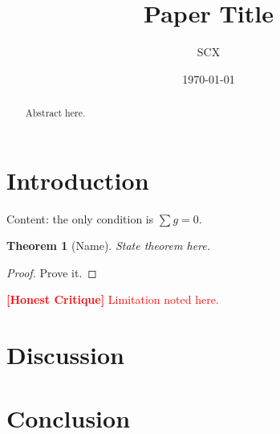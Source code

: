 \documentclass{article}
\title{Paper Title}
\author{SCX}
\date{\today}
\newtheorem{theorem}{Theorem}[section]
\theoremstyle{remark}
\newcommand{\honestcrit}[1]{\textcolor{red}{\textbf{[Honest Critique]} #1}}
\begin{document}
\maketitle

\begin{abstract}
Abstract here.
\end{abstract}

\section{Introduction}

Content: the only condition is $\sum g = 0$.

\begin{theorem}[Name]
State theorem here.
\end{theorem}

\begin{proof}
Prove it.
\end{proof}

\honestcrit{Limitation noted here.}

\section{Discussion}
\section{Conclusion}



\end{document}
